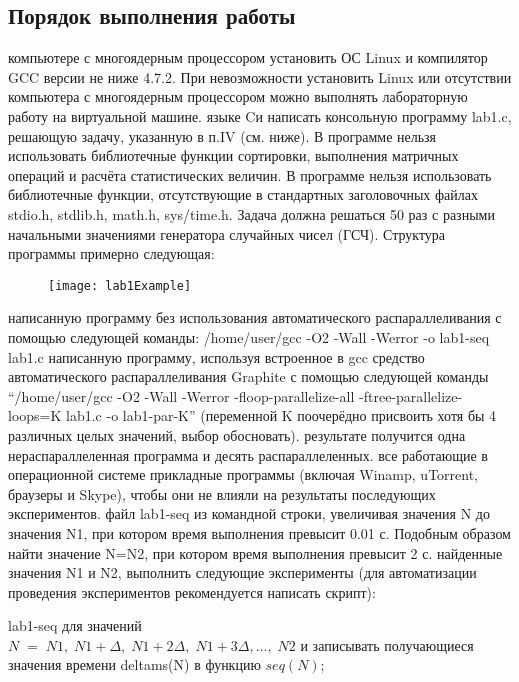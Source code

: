 { %
	\subsection{Порядок выполнения работы}
	\begin{enumerate}
		 компьютере с многоядерным процессором установить ОС Linux и компилятор GCC версии не ниже 4.7.2. При невозможности установить Linux или отсутствии компьютера с многоядерным процессором можно выполнять лабораторную работу на виртуальной машине.
		 языке Cи написать консольную программу lab1.c, решающую задачу, указанную в п.IV (см. ниже). В программе нельзя использовать библиотечные функции сортировки, выполнения матричных операций и расчёта статистических величин.  В программе
нельзя использовать библиотечные функции, отсутствующие в стандартных заголовочных файлах stdio.h, stdlib.h, math.h, sys/time.h. Задача должна решаться 50 раз с разными начальными значениями генератора случайных чисел (ГСЧ).  Структура программы примерно следующая:
			\begin{figure}[H]
				\texttt{[image: lab1Example]}
			\end{figure}
		 написанную программу без использования автоматического распараллеливания с помощью следующей команды: /home/user/gcc -O2 -Wall -Werror -o lab1-seq lab1.c
		 написанную программу, используя встроенное в gcc средство автоматического распараллеливания Graphite с помощью следующей команды “/home/user/gcc -O2 -Wall -Werror -floop-parallelize-all -ftree-parallelize-loops=K lab1.c -o lab1-par-K” (переменной K поочерёдно присвоить хотя бы 4 различных целых значений, выбор обосновать).
		 результате получится одна нераспараллеленная программа и десять распараллеленных.
		 все работающие в операционной системе прикладные программы (включая Winamp, uTorrent, браузеры и Skype), чтобы они не влияли на результаты последующих экспериментов.
		 файл lab1-seq из командной строки, увеличивая значения N до значения N1, при котором время выполнения превысит 0.01 с. Подобным образом найти значение N=N2, при котором время выполнения превысит 2 с.
		 найденные значения N1 и N2, выполнить следующие эксперименты (для автоматизации проведения экспериментов рекомендуется написать скрипт):
			\begin{itemize}
				 lab1-seq для значений \\$N\;=\;{N1,\;N1+\Delta,\;N1+2\Delta,\;N1+3\Delta,…,\;N2}$ и записывать получающиеся значения времени delta\textunderscore ms(N) в функцию $seq(N)$;

\end{itemize}
\end{enumerate}}
